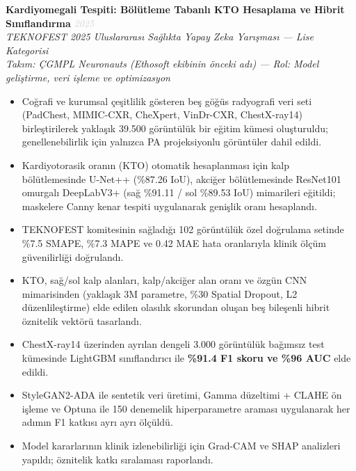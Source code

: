 \documentclass[11pt,a4paper]{article}
\newcommand{\blueitem}[1]{\textcolor{subtitleblue}{\textbf{#1}}}
\newcommand{\daterange}[1]{\hfill \textcolor{lightgray}{\textit{#1}}}
\begin{document}
\blueitem{Kardiyomegali Tespiti: Bölütleme Tabanlı KTO Hesaplama ve Hibrit Sınıflandırma} \daterange{2025}\\
\textit{TEKNOFEST 2025 Uluslararası Sağlıkta Yapay Zeka Yarışması --- Lise Kategorisi} \\
\textit{Takım: ÇGMPL Neuronauts (Ethosoft ekibinin önceki adı) --- Rol: Model geliştirme, veri işleme ve optimizasyon}
\begin{itemize}
    \item Coğrafi ve kurumsal çeşitlilik gösteren beş göğüs radyografi veri seti (PadChest, MIMIC-CXR, CheXpert, VinDr-CXR, ChestX-ray14) birleştirilerek yaklaşık 39.500 görüntülük bir eğitim kümesi oluşturuldu; genellenebilirlik için yalnızca PA projeksiyonlu görüntüler dahil edildi.
    \item Kardiyotorasik oranın (KTO) otomatik hesaplanması için kalp bölütlemesinde U-Net++ (\%87.26 IoU), akciğer bölütlemesinde ResNet101 omurgalı DeepLabV3+ (sağ \%91.11 / sol \%89.53 IoU) mimarileri eğitildi; maskelere Canny kenar tespiti uygulanarak genişlik oranı hesaplandı.
    \item TEKNOFEST komitesinin sağladığı 102 görüntülük özel doğrulama setinde \%7.5 SMAPE, \%7.3 MAPE ve 0.42 MAE hata oranlarıyla klinik ölçüm güvenilirliği doğrulandı.
    \item KTO, sağ/sol kalp alanları, kalp/akciğer alan oranı ve özgün CNN mimarisinden (yaklaşık 3M parametre, \%30 Spatial Dropout, L2 düzenlileştirme) elde edilen olasılık skorundan oluşan beş bileşenli hibrit öznitelik vektörü tasarlandı.
    \item ChestX-ray14 üzerinden ayrılan dengeli 3.000 görüntülük bağımsız test kümesinde LightGBM sınıflandırıcı ile \textbf{\%91.4 F1 skoru ve \%96 AUC} elde edildi.
    \item StyleGAN2-ADA ile sentetik veri üretimi, Gamma düzeltimi + CLAHE ön işleme ve Optuna ile 150 denemelik hiperparametre araması uygulanarak her adımın F1 katkısı ayrı ayrı ölçüldü.
    \item Model kararlarının klinik izlenebilirliği için Grad-CAM ve SHAP analizleri yapıldı; öznitelik katkı sıralaması raporlandı.
\end{itemize}
\end{document}
